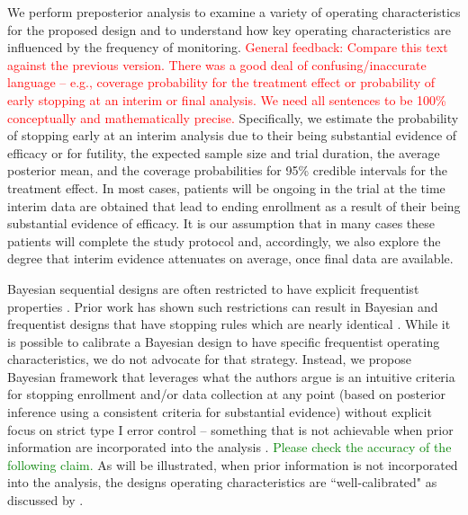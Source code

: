 \documentclass[useAMS,usenatbib,referee]{biom}
\begin{document}
We perform preposterior analysis to examine a variety of operating characteristics for the proposed design
and to understand how key operating characteristics are influenced by the frequency of monitoring.
\textcolor{red}{General feedback: Compare this text against the previous version. There was a good deal of 
confusing/inaccurate language -- e.g.,  coverage probability for the treatment effect or probability of early stopping
at an interim or final analysis. We need all sentences to be 100\% conceptually and mathematically precise.}
Specifically, we estimate the probability of stopping early at an interim analysis due to their being substantial 
evidence of efficacy or for futility, the expected sample size and trial duration, the average posterior mean, and the coverage probabilities for 95\% credible intervals for the treatment effect. 
In most cases, patients will be ongoing in the trial at the time interim data are obtained that lead to 
ending enrollment as a result of their being substantial evidence of efficacy. 
It is our assumption that in many cases these patients will complete the study protocol and, accordingly, we also explore 
the degree that interim evidence attenuates on average, once final data are available.	

Bayesian sequential designs are often restricted to have explicit frequentist properties \citep{Ventz2015, Zhu2015}. 
Prior work has shown such restrictions can result in Bayesian and frequentist designs that have stopping rules which are 
nearly identical \citep{Stallard2020, Kopp-Schneider2019, Zhu2019}.
While it is possible to calibrate a Bayesian design to have specific frequentist operating characteristics, we do not advocate
for that strategy.
Instead, we propose Bayesian framework that leverages what the authors argue is an intuitive criteria for stopping enrollment 
and/or data collection at any point (based on posterior inference using a consistent criteria for substantial evidence) without 
explicit focus on strict type I error control -- something that is not achievable when prior information are incorporated into 
the analysis \citep{Psioda2018}.
\textcolor{green}{Please check the accuracy of the following claim.}
As will be illustrated, when prior information is not incorporated into the analysis, the designs operating characteristics 
are ``well-calibrated" as discussed by \cite{Grieve2016}. 
\end{document}
